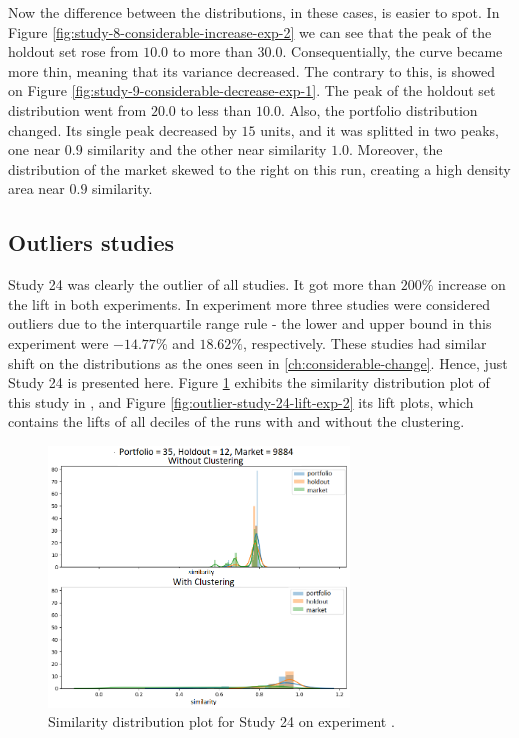 Now the difference between the distributions, in these cases, is easier to spot. In Figure \ref{fig:study-8-considerable-increase-exp-2} we can see that the peak of the holdout set rose from $10.0$ to more than $30.0$. Consequentially, the curve became more thin, meaning that its variance decreased. The contrary to this, is showed on Figure \ref{fig:study-9-considerable-decrease-exp-1}. The peak of the holdout set distribution went from $20.0$ to less than $10.0$. Also, the portfolio distribution changed. Its single peak decreased by $15$ units, and it was splitted in two peaks, one near $0.9$ similarity and the other near similarity $1.0$. Moreover, the distribution of the market skewed to the right on this run, creating a high density area near $0.9$ similarity. 

\subsection{Outliers studies}
\label{ch:outliers}

Study 24 was clearly the outlier of all studies. It got more than $200\%$ increase on the lift in both experiments. In experiment \nameExperimentII{} more three studies were considered outliers due to the interquartile range rule - the lower and upper bound in this experiment were $-14.77\%$ and $18.62\%$, respectively. These studies had similar shift on the distributions as the ones seen in \ref{ch:considerable-change}. Hence, just Study 24 is presented here. Figure \ref{fig:outlier-study-24-exp-2} exhibits the similarity distribution plot of this study in \nameExperimentII{}, and Figure \ref{fig:outlier-study-24-lift-exp-2} its lift plots, which contains the lifts of all deciles of the runs with and without the clustering.

\begin{figure}[!ht]
   \centering
   \includegraphics[width=8cm]{fig/ch4-outlier-study-24-exp-2.png}
   \caption{Similarity distribution plot for Study 24 on experiment \nameExperimentII{}.}
   \label{fig:outlier-study-24-exp-2}
\end{figure}

